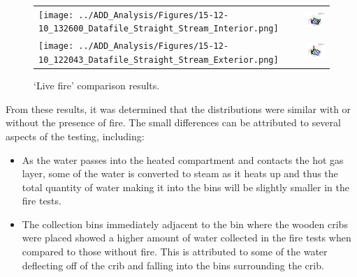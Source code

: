 \documentclass{article}
\begin{document}
\begin{figure}[ht]
\begin{tabular*}{\textwidth}{lr}
\texttt{[image: ../ADD\_Analysis/Figures/15-12-10\_132600\_Datafile\_Straight\_Stream\_Interior.png]} &
\includegraphics[width=3.2in]{../ADD_Analysis/Figures/15-12-09_152435_Datafile_Straight_Stream_Interior.png} \\
\texttt{[image: ../ADD\_Analysis/Figures/15-12-10\_122043\_Datafile\_Straight\_Stream\_Exterior.png]} &
\includegraphics[width=3.2in]{../ADD_Analysis/Figures/15-12-08_113237_Datafile_Straight_Stream_Exterior.png} \\
\end{tabular*}
\caption{`Live fire' comparison results.}
\label{fig:Live_Fire_Comparison}
\end{figure}

From these results, it was determined that the distributions were similar with or without the presence of fire. The small differences can be attributed to several aspects of the testing, including:

\begin{itemize}
	\item As the water passes into the heated compartment and contacts the hot gas layer, some of the water is converted to steam as it heats up and thus the total quantity of water making it into the bins will be slightly smaller in the fire tests.
	\item The collection bins immediately adjacent to the bin where the wooden cribs were placed showed a higher amount of water collected in the fire tests when compared to those without fire. This is attributed to some of the water deflecting off of the crib and falling into the bins surrounding the crib.
\end{itemize}
\end{document}
